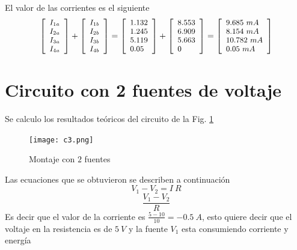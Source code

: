 \documentclass[twocolumn]{IEEEtran}
\begin{document}
\noindent
El valor de las corrientes es el siguiente
\begin{equation}
\footnotesize
 \left[ \begin{array}{l}
 {I_{1a}} \\ 
 {I_{2a}} \\ 
 {I_{3a}} \\ 
 {I_{4a}} \\ 
 \end{array} \right] + \left[ \begin{array}{l}
 {I_{1b}} \\ 
 {I_{2b}} \\ 
 {I_{3b}} \\ 
 {I_{4b}} \\ 
 \end{array} \right] = \left[ \begin{array}{l}
 1.132 \\ 
 1.245 \\ 
 5.119 \\ 
 0.05 \\ 
 \end{array} \right] + \left[ \begin{array}{l}
 8.553 \\ 
 6.909 \\ 
 5.663 \\ 
 0 \\ 
 \end{array} \right] = \left[ \begin{array}{l}
 9.685 \ mA \\ 
 8.154 \ mA \\ 
 10.782 \ mA \\ 
 0.05 \ mA \\ 
 \end{array} \right]
\end{equation}

\section{Circuito con 2 fuentes de voltaje}
\noindent
Se calculo los resultados teóricos del circuito de la Fig. \ref{fig4}
\begin{figure}[H]
	\centering
		\texttt{[image: c3.png]}
	\caption{Montaje con $2$ fuentes}
	\label{fig4}
\end{figure}
\noindent
Las ecuaciones que se obtuvieron se describen a continuación
\begin{equation}
{V_1} - {V_2} = I \ R
\end{equation}
\begin{equation}
 \frac{{V_1} - {V_2}}{R}
\end{equation}
\noindent
Es decir que el valor de la corriente es $\frac{5 - 10}{10} = -0.5\ A$, esto quiere decir que el voltaje en la resistencia es de $5\ V$ y la fuente $V_1$ esta consumiendo corriente y energía
\end{document}
